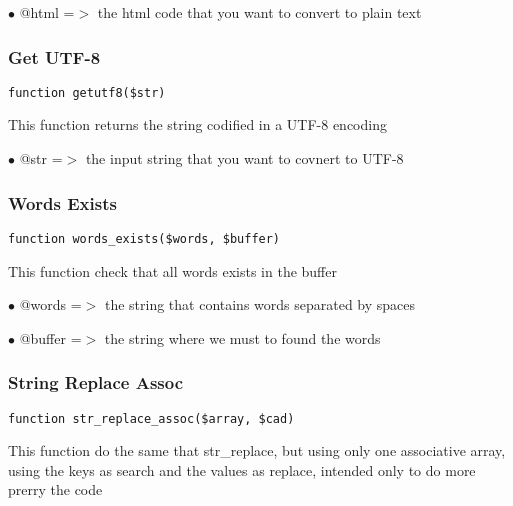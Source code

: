 \documentclass[a4paper]{article}
\begin{document}
\begin{compactitem}
\item[\color{myblue}$\bullet$] @html =$>$ the html code that you want to convert to plain text
\end{compactitem}

\hypertarget{toc245}{}
\subsubsection{Get UTF-8}

\begin{lstlisting}
function getutf8($str)
\end{lstlisting}

This function returns the string codified in a UTF-8 encoding

\begin{compactitem}
\item[\color{myblue}$\bullet$] @str =$>$ the input string that you want to covnert to UTF-8
\end{compactitem}

\hypertarget{toc246}{}
\subsubsection{Words Exists}

\begin{lstlisting}
function words_exists($words, $buffer)
\end{lstlisting}

This function check that all words exists in the buffer

\begin{compactitem}
\item[\color{myblue}$\bullet$] @words  =$>$ the string that contains words separated by spaces
\item[\color{myblue}$\bullet$] @buffer =$>$ the string where we must to found the words
\end{compactitem}

\hypertarget{toc247}{}
\subsubsection{String Replace Assoc}

\begin{lstlisting}
function str_replace_assoc($array, $cad)
\end{lstlisting}

This function do the same that str\_replace, but using only one associative
array, using the keys as search and the values as replace, intended only
to do more prerry the code
\end{document}
